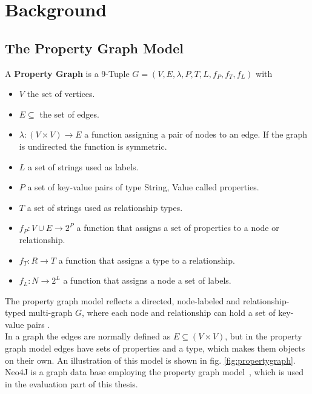 \chapter{Background}\label{\positionnumber} 

\section{The Property Graph Model}\label{\positionnumber}
A \textbf{Property Graph} is a 9-Tuple $G = (V, E, \lambda, P, T, L, f_P, f_T, f_L)$ with 
\begin{itemize}
    \item $V$ the set of vertices.
    \item $E \subseteq $ the set of edges.
    \item $\lambda: (V \times V) \rightarrow E$ a function assigning a pair of nodes to an edge. If the graph is undirected the function is symmetric.
    \item $L$ a set of strings used as labels.
    \item $P$ a set of key-value pairs of type String, Value called properties.
    \item $T$ a set of strings used as relationship types.
    \item $f_P: V \cup E \rightarrow 2^P$ a function that assigns a set of properties to a node or relationship.
   \item $f_T: R \rightarrow T$ a function that assigns a type to  a relationship.
   \item  $f_L: N \rightarrow 2^L$ a function that assigns a node a set of labels.
\end{itemize} 
\smallskip
The property graph model reflects a directed, node-labeled and relationship-typed multi-graph $G$, where each node and relationship can hold a set of key-value pairs \cite{angles2018property}. \\
    In a graph the edges are normally defined as $E \subseteq (V \times V)$, but in the property graph model edges have sets of properties and a type, which makes them objects on their own.
    An illustration of this model is shown in fig. \ref{fig:propertygraph}.
Neo4J is a graph data base employing the property graph model~\cite{neo4j_book}, which is used in the evaluation part of this thesis.


